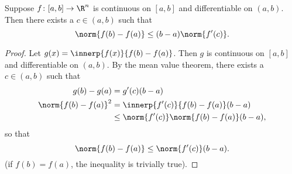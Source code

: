 \begin{theorem} \label{thm:diff:vector:mvt}
    Suppose $f\colon [a, b] \to \R^n$ is continuous on $[a, b]$ and
    differentiable on $(a, b)$.
    Then there exists a $c \in (a, b)$ such that \[
        \norm{f(b) - f(a)} \leq (b - a) \norm{f'(c)}.
    \]
\end{theorem}
\begin{proof}
    Let $g(x) = \innerp{f(x)}{f(b) - f(a)}$.
    Then $g$ is continuous on $[a, b]$ and differentiable on $(a, b)$.
    By the mean value theorem, there exists a $c \in (a, b)$ such that
    \begin{align*}
        g(b) - g(a) &= g'(c) (b - a) \\
        \norm{f(b) - f(a)}^2 &= \innerp{f'(c)}{f(b) - f(a)} (b - a) \\
        &\le \norm{f'(c)} \norm{f(b) - f(a)} (b - a),
    \end{align*} so that \[
        \norm{f(b) - f(a)} \le \norm{f'(c)} (b - a).
    \] (if $f(b) = f(a)$, the inequality is trivially true).
\end{proof}
